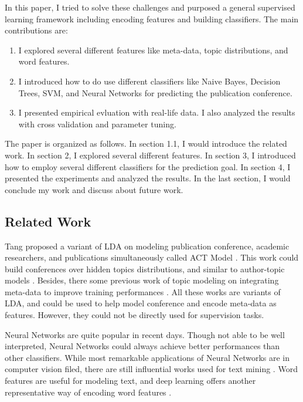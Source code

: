 In this paper, I tried to solve these challenges and purposed a general
supervised learning framework including encoding features and building
classifiers. The main contributions are:

\begin{enumerate}[1. ]
\item I explored several different features like meta-data, topic distributions,
and word features.

\item I introduced how to do use different classifiers like Naive Bayes,
Decision Trees, SVM, and Neural Networks for predicting the publication
conference.

\item I presented empirical evluation with real-life data. I also analyzed the
results with cross validation and parameter tuning.
\end{enumerate}

The paper is organized as follows. In section 1.1, I would introduce the related
work. In section 2, I explored several different features. In section 3, I
introduced how to employ several different classifiers for the prediction goal.
In section 4, I presented the experiments and analyzed the results. In the
last section, I would conclude my work and discuss about future work.


\subsection{Related Work}
Tang proposed a variant of LDA on modeling publication conference,
academic researchers, and publications simultaneously called ACT Model
\cite{tang2008arnetminer}. This work could build conferences over hidden topics
distributions, and similar to author-topic models \cite{rosen2004author}.
Besides, there some previous work of topic modeling on integrating meta-data to
improve training performances \cite{mimno2012topic} \cite{petterson2010word}.
All these works are variants of LDA, and could be used to help model conference
and encode meta-data as features. However, they could not be directly used for
supervision tasks.

Neural Networks are quite popular in recent days. Though not able to be well
interpreted, Neural Networks could always achieve better performances than other
classifiers. While most remarkable applications of Neural Networks are in
computer vision filed, there are still influential works used for text mining
\cite{bengio2003neural} \cite{hochreiter1997long}. Word features are useful for
modeling text, and deep learning offers another representative way of encoding
word features \cite{mikolov2013distributed}.

